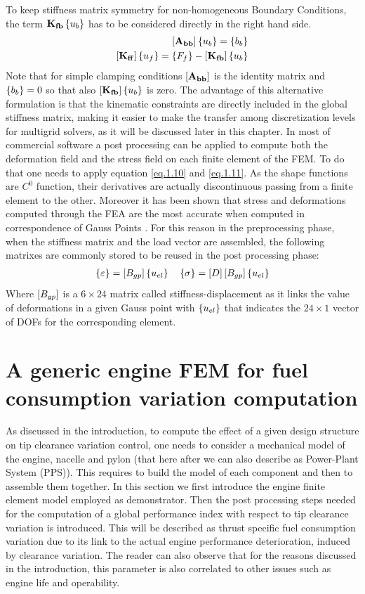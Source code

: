 To keep stiffness matrix symmetry for non-homogeneous Boundary Conditions, the term  $\mathbf{K_{fb}}\left\lbrace{u_b}\right \rbrace$ has to be considered directly in the right hand side.
\begin{eqnarray}
\label{eq.1.17s}
\left[{\mathbf{A_{bb}}}\right]\left\lbrace{u_b}\right \rbrace=\left\lbrace{b_b}\right \rbrace\\
\label{eq.1.18s}
\left[{\mathbf{K_{ff}}}\right]\left\lbrace{u_f}\right \rbrace=\left\lbrace{F_f}\right \rbrace-\left[{\mathbf{K_{fb}}}\right]\left\lbrace{u_b}\right \rbrace
\end{eqnarray}
Note that for simple clamping conditions $\left[{\mathbf{A_{bb}}}\right]$ is the identity matrix and $\left\lbrace{b_b}\right \rbrace=0$  so that also $\left[{\mathbf{K_{fb}}}\right]\left\lbrace{u_b}\right \rbrace$ is zero.
The advantage of this alternative formulation is that the kinematic constraints are directly included in the global stiffness matrix, making it easier to make the transfer among discretization levels for multigrid solvers, as it will be discussed later in this chapter.
In most of commercial software a post processing can be applied to compute both the deformation field and the stress field on each finite element of the FEM. To do that one needs to apply equation \ref{eq.1.10} and \ref{eq.1.11}. As the shape functions are $C^0$ function, their derivatives are actually discontinuous passing from a finite element to the other. Moreover it has been shown that stress and deformations computed through the FEA are the most accurate when computed in correspondence of Gauss Points \cite{zlamal1978superconvergence,zhang2006natural}. For this reason in the preprocessing phase, when the stiffness matrix and the load vector are assembled, the following matrixes are commonly stored to be reused in the post processing phase:
\begin{eqnarray}
\label{eq.1.40}
	\left\lbrace{\varepsilon}\right \rbrace=\left[{B_{gp}}\right]\left\lbrace{u_{el}}\right \rbrace \quad
	\left\lbrace{\sigma}\right \rbrace=\left[{D}\right]\left[{B_{gp}}\right]\left\lbrace{u_{el}}\right \rbrace
\end{eqnarray}
Where $\left[{B_{gp}}\right]$ is a $6\times 24$ matrix called stiffness-displacement as it links the value of deformations in a given Gauss point with $\left\lbrace{u_{el}}\right \rbrace$ that indicates the $24\times1$ vector of DOFs for the corresponding element.
\section{A generic engine FEM for fuel consumption variation computation}
As discussed in the introduction, to compute the effect of a given design structure on tip clearance variation control, one needs to consider a mechanical model of the engine, nacelle and pylon (that here after we can also describe as Power-Plant System (PPS)). This requires to build the model of each component and then to assemble them together.
In this section we first introduce the engine finite element model employed as demonstrator. Then the post processing steps needed for the computation of a global performance index with respect to tip clearance variation is introduced. This will be described as thrust specific fuel consumption variation due to its link to the actual engine performance deterioration, induced by clearance variation. The reader can also observe that for the reasons discussed in the introduction, this parameter is also correlated to other issues such as engine life and operability.
